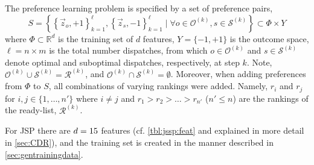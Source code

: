 \documentclass[smallextended]{svjour3}
\begin{document}
	The preference learning problem is specified by a set of preference pairs,
	\begin{equation}
	S = \left\{\left\{\vec{z}_o,+1\right\}_{k=1}^{\ell},\left\{\vec{z}_s,-1\right\}_{k=1}^{\ell}
	\;|\;\forall o\in \mathcal{O}^{(k)},s\in \mathcal{S}^{(k)}
	\right\}\subset \Phi\times Y \label{eq:prefset}
	\end{equation}
	where $\Phi\subset \mathbb{R}^d$ is the training set of $d$ features, 
	$Y=\{-1,+1\}$ is the outcome space, $\ell=n\times m$ is the total number dispatches, 
	from which $o\in\mathcal{O}^{(k)}$ and $s\in \mathcal{S}^{(k)}$ denote optimal and suboptimal dispatches, respectively, at step $k$. 
	Note, $\mathcal{O}^{(k)}\cup\mathcal{S}^{(k)}=\mathcal{R}^{(k)}$, and $\mathcal{O}^{(k)}\cap\mathcal{S}^{(k)}=\emptyset$. 
	Moreover, when adding preferences from $\Phi$ to $S$, all combinations of varying rankings were added. Namely, $r_i$ and $r_j$ for $i,j\in\{1,\ldots,n'\}$ where $i\neq j$ and $r_1>r_2>\ldots>r_{n'}$ ($n'\leq n$) are the rankings of the ready-list, $\mathcal{R}^{(k)}$.
	
	For JSP there are $d=15$ features (cf. \cref{tbl:jssp:feat} and explained in more detail in \cref{sec:CDR}), and the training set is created in the manner described in \cref{sec:gentrainingdata}.
	
\end{document}
